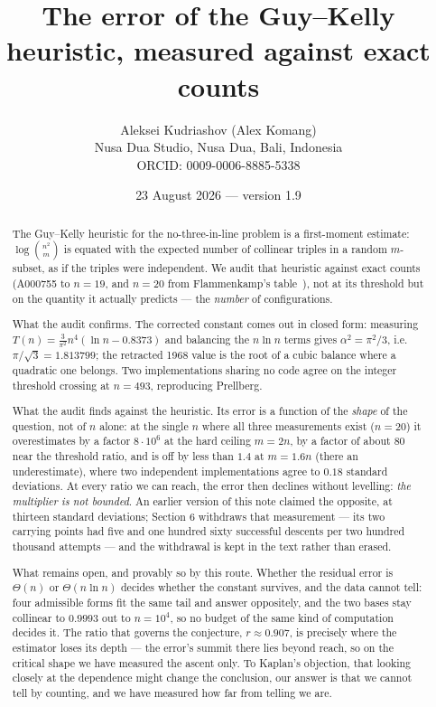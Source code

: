 \documentclass[11pt,a4paper]{article}
\title{The error of the Guy--Kelly heuristic, measured against exact counts}
\author{Aleksei Kudriashov (Alex Komang)\\ \small Nusa Dua Studio, Nusa Dua, Bali, Indonesia\\ \small ORCID: 0009-0006-8885-5338}
\date{23 August 2026 --- version 1.9}
\begin{document}
\maketitle
\begin{abstract}
The Guy--Kelly heuristic for the no-three-in-line problem is a first-moment estimate:
$\log\binom{n^2}{m}$ is equated with the expected number of collinear triples in a random
$m$-subset, as if the triples were independent.  We audit that heuristic against exact counts
(A000755 to $n=19$, and $n=20$ from Flammenkamp's table~\cite{Flammenkamp}), not at its threshold
but on the quantity it actually predicts --- the \emph{number} of configurations.

What the audit confirms.  The corrected constant comes out in closed form: measuring
$T(n)=\tfrac{3}{\pi^2}n^4(\ln n-0.8373)$ and balancing the $n\ln n$ terms gives
$\alpha^2=\pi^2/3$, i.e.\ $\pi/\sqrt3=1.813799$; the retracted 1968 value is the root of a cubic
balance where a quadratic one belongs.  Two implementations sharing no code agree on the integer
threshold crossing at $n=493$, reproducing Prellberg.

What the audit finds against the heuristic.  Its error is a function of the \emph{shape} of the
question, not of $n$ alone: at the single $n$ where all three measurements exist ($n=20$) it
overestimates by a factor $8\cdot10^{6}$ at the hard ceiling $m=2n$, by a factor of about $80$
near the threshold ratio, and is off by less than $1.4$ at $m=1.6n$ (there an underestimate),
where two independent implementations agree to $0.18$ standard deviations.  At every ratio we can
reach, the error then declines without levelling: \emph{the multiplier is not bounded}.  An
earlier version of this note claimed the opposite, at thirteen standard deviations; Section 6
withdraws that measurement --- its two carrying points had five and one hundred sixty successful
descents per two hundred thousand attempts --- and the withdrawal is kept in the text rather than
erased.

What remains open, and provably so by this route.  Whether the residual error is $\Theta(n)$ or
$\Theta(n\ln n)$ decides whether the constant survives, and the data cannot tell: four admissible
forms fit the same tail and answer oppositely, and the two bases stay collinear to $0.9993$ out
to $n=10^4$, so no budget of the same kind of computation decides it.  The ratio that governs the
conjecture, $r\approx0.907$, is precisely where the estimator loses its depth --- the error's
summit there lies beyond reach, so on the critical shape we have measured the ascent only.  To
Kaplan's objection, that looking closely at the dependence might change the conclusion, our
answer is that we cannot tell by counting, and we have measured how far from telling we are.
\end{abstract}
\end{document}
